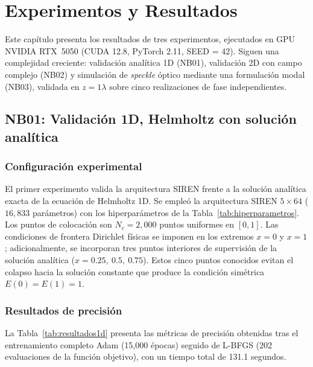 \chapter{Experimentos y Resultados}\label{cap4:resultados}

Este capítulo presenta los resultados de tres experimentos, ejecutados en GPU
NVIDIA RTX~5050 (CUDA 12.8, PyTorch 2.11, SEED = 42). Siguen una complejidad
creciente: validación analítica 1D (NB01), validación 2D con campo complejo
(NB02) y simulación de \textit{speckle} óptico mediante una formulación modal
(NB03), validada en $z = 1\lambda$ sobre cinco realizaciones de fase
independientes.

\section{NB01: Validación 1D, Helmholtz con solución analítica}
\label{sec:resultados1d}

\subsection{Configuración experimental}

El primer experimento valida la arquitectura SIREN frente a la solución analítica
exacta de la ecuación de Helmholtz 1D. Se empleó la arquitectura SIREN
$5 \times 64$ ($16{,}833$ parámetros) con los hiperparámetros de la
Tabla~\ref{tab:hiperparametros}. Los puntos de colocación son $N_c = 2{,}000$
puntos uniformes en $[0,1]$. Las condiciones de frontera Dirichlet físicas se
imponen en los extremos $x=0$ y $x=1$; adicionalmente, se incorporan tres
puntos interiores de supervisión de la solución analítica
($x=0.25,\ 0.5,\ 0.75$). Estos cinco puntos conocidos evitan el colapso hacia
la solución constante que produce la condición simétrica $E(0)=E(1)=1$.

\subsection{Resultados de precisión}

La Tabla~\ref{tab:resultados1d} presenta las métricas de precisión obtenidas
tras el entrenamiento completo Adam (15{,}000 épocas) seguido de L-BFGS
(202 evaluaciones de la función objetivo), con un tiempo total de
131.1 segundos.

